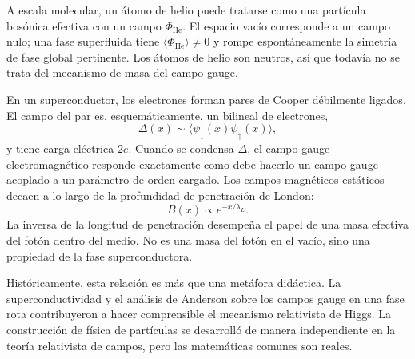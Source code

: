 A escala molecular, un átomo de helio puede tratarse como una partícula bosónica efectiva con un campo \(\Phi_{\mathrm{He}}\). El espacio vacío corresponde a un campo nulo; una fase superfluida tiene \(\langle\Phi_{\mathrm{He}}\rangle\ne0\) y rompe espontáneamente la simetría de fase global pertinente. Los átomos de helio son neutros, así que todavía no se trata del mecanismo de masa del campo gauge.

En un superconductor, los electrones forman pares de Cooper débilmente ligados. El campo del par es, esquemáticamente, un bilineal de electrones,
\begin{equation}
  \Delta(x)\sim\langle\psi_\downarrow(x)\psi_\uparrow(x)\rangle,
  \label{eq:l10-cooper-order-parameter}
\end{equation}
y tiene carga eléctrica \(2e\). Cuando se condensa \(\Delta\), el campo gauge electromagnético responde exactamente como debe hacerlo un campo gauge acoplado a un parámetro de orden cargado. Los campos magnéticos estáticos decaen a lo largo de la profundidad de penetración de London:
\begin{equation}
  B(x)\propto e^{-x/\lambda_L}.
  \label{eq:l10-meissner-screening}
\end{equation}
La inversa de la longitud de penetración desempeña el papel de una masa efectiva del fotón dentro del medio. No es una masa del fotón en el vacío, sino una propiedad de la fase superconductora.

\begin{classroomqa}\end{classroomqa}

Históricamente, esta relación es más que una metáfora didáctica. La superconductividad y el análisis de Anderson sobre los campos gauge en una fase rota contribuyeron a hacer comprensible el mecanismo relativista de Higgs. La construcción de física de partículas se desarrolló de manera independiente en la teoría relativista de campos, pero las matemáticas comunes son reales.

